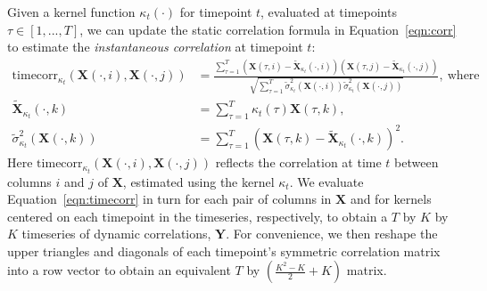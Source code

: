 \documentclass[english]{article}
\begin{document}
Given a kernel function $\kappa_t(\cdot)$ for timepoint $t$,
evaluated at timepoints $\tau \in \left[ 1, ..., T \right]$, we
can update the static correlation formula in Equation~\ref{eqn:corr}
to estimate the \textit{instantaneous correlation} at timepoint $t$:
\begin{align}
  \mathrm{timecorr}_{\kappa_t}\left(\mathbf{X}(\cdot, i), \mathbf{X}(\cdot, j)\right) &= \frac{\sum_{\tau=1}^T \left( \mathbf{X}(\tau, i) -
                                       \widetilde{\mathbf{X}}_{\kappa_t}(\cdot,
                                                                                        i) \right)
                                 \left( \mathbf{X}(\tau, j) -
                                        \widetilde{\mathbf{X}}_{\kappa_t}(\cdot,
                                                                                        j)\right)}
              {\sqrt{\sum_{\tau=1}^T
                                              \widetilde{\sigma}_{\kappa_t}^2(\mathbf{X}(\cdot,
                                                                                        i))
                                              \widetilde{\sigma}_{\kappa_t}^2(\mathbf{X}(\cdot, j))}},~\mathrm{where}\label{eqn:timecorr}\\
  \widetilde{\mathbf{X}}_{\kappa_t}(\cdot, k) &= \sum_{\tau=1}^T
                       \kappa_t(\tau)\mathbf{X}(\tau, k),\\
  \widetilde{\sigma}_{\kappa_t}^2(\mathbf{X}(\cdot, k)) &= \sum_{\tau=1}^T
                                                  \left(
                                                  \mathbf{X}(\tau, k) -
                            \widetilde{\mathbf{X}}_{\kappa_t}(\cdot, k) \right)^2.
\end{align}
Here
$\mathrm{timecorr}_{\kappa_t}(\mathbf{X}(\cdot, i), \mathbf{X}(\cdot,
j))$ reflects the correlation at time $t$ between columns $i$ and $j$
of $\mathbf{X}$, estimated using the kernel $\kappa_t$.  We evaluate
Equation~\ref{eqn:timecorr} in turn for each pair of columns in
$\mathbf{X}$ and for kernels centered on each timepoint in the
timeseries, respectively, to obtain a $T$ by $K$ by $K$ timeseries of
dynamic correlations, $\mathbf{Y}$.  For convenience, we then reshape
the upper triangles and diagonals of each timepoint's symmetric correlation matrix into a row
vector to obtain an equivalent $T$ by $\left( \frac{K^2 - K}{2} + K \right)$ matrix.
\end{document}
